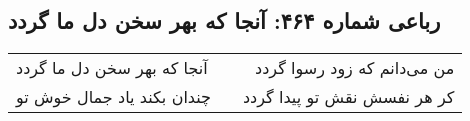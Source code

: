 \begin{center}
\section*{رباعی شماره ۴۶۴: آنجا که بهر سخن دل ما گردد}
\label{sec:0464}
\begin{longtable}{l p{0.5cm} r}
آنجا که بهر سخن دل ما گردد
&&
من می‌دانم که زود رسوا گردد
\\
چندان بکند یاد جمال خوش تو
&&
کر هر نفسش نقش تو پیدا گردد
\\
\end{longtable}
\end{center}
